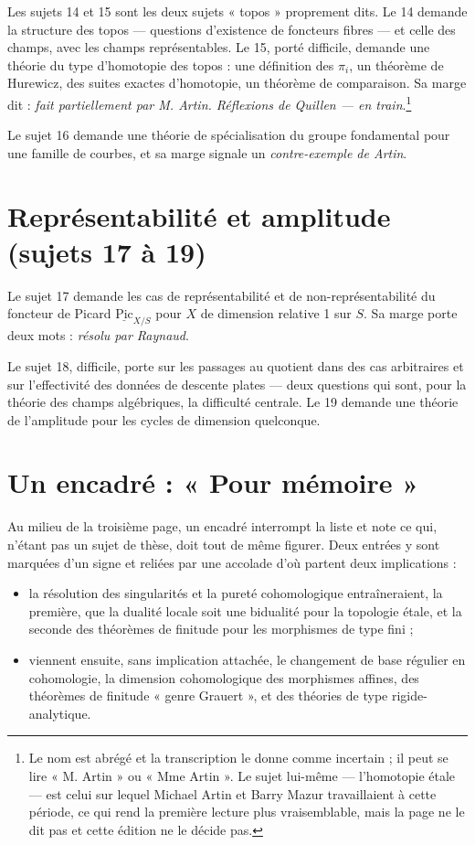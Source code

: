 \documentclass[11pt,a4paper]{article}
\begin{document}
Les sujets 14 et 15 sont les deux sujets « topos » proprement dits. Le 14
demande la structure des topos --- questions d'existence de foncteurs fibres ---
et celle des champs, avec les champs représentables. Le 15, porté difficile,
demande une théorie du type d'homotopie des topos : une définition des
$\pi_{i}$, un théorème de Hurewicz, des suites exactes d'homotopie, un théorème
de comparaison. Sa marge dit : \emph{fait partiellement par M. Artin. Réflexions
de Quillen --- en train}.\footnote{Le nom est abrégé et la transcription le donne
comme incertain ; il peut se lire « M. Artin » ou « Mme Artin ». Le sujet lui-même
--- l'homotopie étale --- est celui sur lequel Michael Artin et Barry Mazur
travaillaient à cette période, ce qui rend la première lecture plus vraisemblable,
mais la page ne le dit pas et cette édition ne le décide pas.}

Le sujet 16 demande une théorie de spécialisation du groupe fondamental pour
une famille de courbes, et sa marge signale un \emph{contre-exemple de Artin}.

\section*{Représentabilité et amplitude (sujets 17 à 19)}

Le sujet 17 demande les cas de représentabilité et de non-représentabilité du
foncteur de Picard $\underline{\mathrm{Pic}}_{X/S}$ pour $X$ de dimension
relative 1 sur $S$. Sa marge porte deux mots : \emph{résolu par Raynaud}.

Le sujet 18, difficile, porte sur les passages au quotient dans des cas
arbitraires et sur l'effectivité des données de descente plates --- deux
questions qui sont, pour la théorie des champs algébriques, la difficulté
centrale. Le 19 demande une théorie de l'amplitude pour les cycles de dimension
quelconque.

\section*{Un encadré : « Pour mémoire »}

Au milieu de la troisième page, un encadré interrompt la liste et note ce qui,
n'étant pas un sujet de thèse, doit tout de même figurer. Deux entrées y sont
marquées d'un signe et reliées par une accolade d'où partent deux implications :

\begin{itemize}
\item la résolution des singularités et la pureté cohomologique
entraîneraient, la première, que la dualité locale soit une bidualité pour la
topologie étale, et la seconde des théorèmes de finitude pour les morphismes de
type fini ;
\item viennent ensuite, sans implication attachée, le changement de base
régulier en cohomologie, la dimension cohomologique des morphismes affines, des
théorèmes de finitude « genre Grauert », et des théories de type
rigide-analytique.
\end{itemize}
\end{document}
